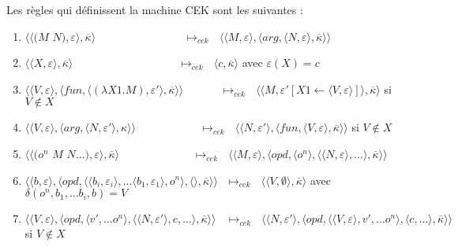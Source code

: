 \documentclass[10pt,a4paper]{report}
\begin{document}
	
	Les règles qui définissent la machine CEK sont les suivantes :
	\begin{enumerate}
		\item $\langle\langle(M$ $N),\varepsilon\rangle,\overline{\kappa}\rangle 
		~~~~~~~~~~~~~~~~~~~~~~~~~~~~~~~~~~~~\longmapsto_{cek}~~~
		\langle \langle M,\varepsilon\rangle,\langle arg,\langle N,\varepsilon\rangle,\overline{\kappa}\rangle\rangle$	
		
		\item $\langle\langle X,\varepsilon\rangle,\overline{\kappa}\rangle
		~~~~~~~~~~~~~~~~~~~~~~~~~~~~~~~~~~~~~~~~~~~\longmapsto_{cek}~~~
		\langle c,\overline{\kappa}\rangle$ avec $\varepsilon(X) = c$
		
		\item $\langle\langle V,\varepsilon\rangle,\langle fun,\langle (\lambda X1.M),\varepsilon'\rangle,\overline{\kappa} \rangle \rangle 
		~~~~~~~~~~~~~~~\longmapsto_{cek}~~~
		\langle \langle M,\varepsilon'[X1 \leftarrow \langle V,\varepsilon\rangle]\rangle,\overline{\kappa}\rangle$ si $V \notin X$
		
		\item  $\langle \langle V,\varepsilon\rangle,\langle arg,\langle N,\varepsilon'\rangle,\kappa\rangle\rangle ~~~~~~~~~~~~~~~~~~~~~~~~~~\longmapsto_{cek}~~~
		\langle \langle N,\varepsilon'\rangle,\langle fun,\langle V,\varepsilon\rangle,\overline{\kappa}\rangle\rangle$ si $V \notin X$
		
		\item $\langle\langle(o^{n}$ $M$ $N...),\varepsilon\rangle,\overline{\kappa}\rangle ~~~~~~~~~~~~~~~~~~~~~~~~~~~~~~\longmapsto_{cek}~~~
		\langle \langle M,\varepsilon\rangle,\langle opd,\langle o^{n}\rangle,\langle \langle N,\varepsilon\rangle,...\rangle,\overline{\kappa}\rangle\rangle$
		
		\item $\langle  \langle b,\varepsilon\rangle,\langle opd,\langle \langle b_{i},\varepsilon_{i}\rangle,...\langle b_{1},\varepsilon_{1}\rangle ,o^{n}\rangle,\langle\rangle,\overline{\kappa}\rangle\rangle
		~~~\longmapsto_{cek}~~~
		\langle \langle V,\emptyset\rangle,\overline{\kappa}\rangle$ avec $\delta(o^{n},b_{1},...b_{i},b) = V$
		
		\item $\langle \langle V,\varepsilon\rangle,\langle opd,\langle v',...o^{n}\rangle,\langle  \langle N,\varepsilon'\rangle,c,...\rangle,\overline{\kappa}\rangle\rangle
		~~~~\longmapsto_{cek}~~~
		\langle \langle N,\varepsilon'\rangle,\langle opd,\langle  \langle V,\varepsilon\rangle,v',...o^{n}\rangle,\langle c,...\rangle,\overline{\kappa}\rangle\rangle$ si $V \notin X$
	\end{enumerate}
	\bigbreak
	
\end{document}

